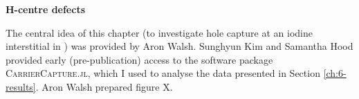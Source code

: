 \vspace{\frontmatterbaselineskip}

\textbf{H-centre defects}

The central idea of this chapter (to investigate hole capture at an iodine interstitial in ) was provided by Aron Walsh. Sunghyun Kim and Samantha Hood provided early (pre-publication) access to the software package \textsc{CarrierCapture.jl}, which I used to analyse the data presented in Section \ref{ch:6-results}. Aron Walsh prepared figure X.